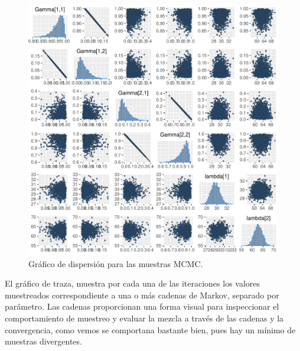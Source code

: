\documentclass[a4paper]{article}\usepackage[]{graphicx}\usepackage[]{color}
\makeatletter
\def\maxwidth{ %
  \ifdim\Gin@nat@width>\linewidth
    \linewidth
  \else
    \Gin@nat@width
  \fi
}
\newenvironment{knitrout}{}{} %
\makeatother
\begin{document}
\begin{knitrout}
\color{fgcolor}\begin{figure}
\includegraphics[width=\maxwidth]{figure/unnamed-chunk-31-1} \caption[Gráfico de dispersión para las muestras MCMC]{Gráfico de dispersión para las muestras MCMC.}\label{fig:unnamed-chunk-31}
\end{figure}


\end{knitrout}

El gráfico de traza, muestra por cada una de las iteraciones los valores muestreados correspondiente a una o más cadenas de Markov, separado por parámetro. Las cadenas proporcionan una forma visual para inspeccionar el comportamiento de muestreo y evaluar la mezcla a través de las cadenas y la convergencia, como vemos se comportana bastante bien, pues hay un mínimo de muestras divergentes.
\end{document}
